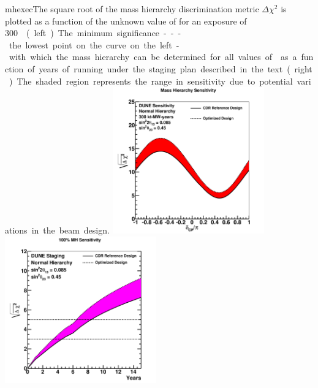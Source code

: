 \begin{cdrfigure}{mhexec}{The
    square root of the mass hierarchy discrimination metric $\Delta
    \chi^2$ is plotted as a function of the unknown value of \deltacp
    for an exposure of \SI{300}\ktMWyr{} %
    (left).  The minimum significance
    --- the lowest point on the curve on the left - with which the mass
    hierarchy can be determined for all values of \deltacp as a
    function of years of running under the staging plan described in the text (right).
    The shaded region represents the range in sensitivity due to
    potential variations in the beam design.}
\includegraphics[width=0.49\textwidth]{volume-physics/figures/mh_300ktmwyear}
\includegraphics[width=0.49\textwidth]{volume-physics/figures/mh_exp_staging15yr}
\label{fig:mhexec}
\end{cdrfigure}


